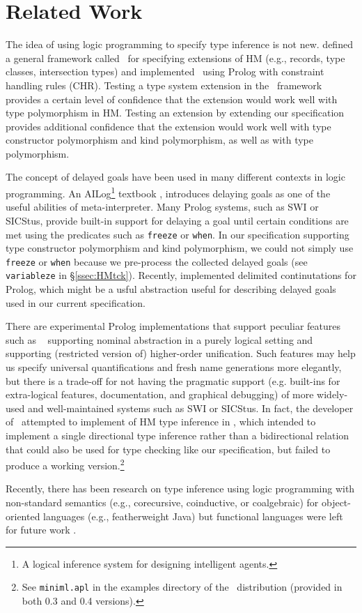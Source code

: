 \section{Related Work}\label{sec:relwork}
The idea of using logic programming to specify type inference is not new.
\citet*{HMX99} defined a general framework called \HMX\ for specifying
extensions of HM (e.g., records, type classes, intersection types)
and \citet{tyinferCHR02} implemented \HMX\ using Prolog with
constraint handling rules (CHR). Testing a type system extension
in the \HMX\ framework provides a certain level of confidence that the extension
would work well with type polymorphism in HM. Testing an extension by
extending our specification provides additional confidence that the extension
would work well with type constructor polymorphism and kind polymorphism,
as well as with type polymorphism.

The concept of delayed goals have been used in many different contexts
in logic programming. An AILog\footnote{A logical inference system for designing
	 intelligent agents.} textbook \cite{AILogTextBook},
introduces delaying goals as one of the useful abilities of meta-interpreter.
Many Prolog systems, such as SWI or SICStus, provide built-in support for
delaying a goal until certain conditions are met using the predicates
such as \verb|freeze| or \verb|when|. In our specification supporting
type constructor polymorphism and kind polymorphism, we could not
simply use \verb|freeze| or \verb|when| because we pre-process
the collected delayed goals (see \verb|variableze| in \S\ref{ssec:HMtck}).
Recently, \citet{SchDemDesWei13} implemented delimited continutations for Prolog,
which might be a usful abstraction useful for describing delayed goals used in
our current specification.

There are experimental Prolog implementations that support peculiar features
such as \aProlog\ \cite{cheney04iclp}
supporting nominal abstraction in a purely logical setting
and \lProlog\ \cite{nadathur99cade}
supporting (restricted version of) higher-order unification.
Such features may help us specify universal quantifications and fresh name
generations more elegantly, but there is a trade-off for not having the
pragmatic support (e.g. built-ins for extra-logical features, documentation, and
graphical debugging) of more widely-used and well-maintained systems
such as SWI or SICStus. In fact, the developer of \aProlog\ attempted to
implement of HM type inference in \aProlog, which intended to implement a single
directional type inference rather than a bidirectional relation that could also
be used for type checking like our specification, but failed to produce a working
version.\footnote{See \texttt{miniml.apl} in the examples directory of
	the \aProlog\ distribution (provided in both 0.3 and 0.4 versions). }

Recently, there has been research on type inference using logic programming
with non-standard semantics (e.g., corecursive, coinductive, or coalgebraic)
for object-oriented languages (e.g., featherweight Java) but
functional languages were left for future work \cite{AL-ECOOP09}.

